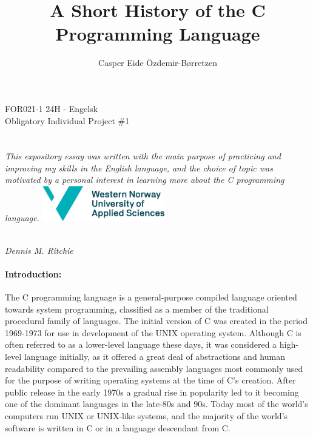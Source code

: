 \documentclass{report}%
\title{A Short History of the C Programming Language}
\author{Casper Eide Özdemir-Børretzen}
\begin{document}
\makeatletter
\begin{titlepage}
\begin{center}
\vspace*{6cm}
\large{FOR021-1 24H  - Engelsk\\Obligatory Individual Project \#1}\\
\vspace{0.5cm}
\LARGE{\@title}\\
\vspace{1cm}
\large{\@author}\\
\vspace{2cm}
\small{\textit{This expository essay was written with the main purpose of practicing and improving my skills in the English language, and the choice of topic was motivated by a personal interest in learning more about the C programming language.}}
\vfill
\includegraphics[width=0.4\textwidth]{hvl_logo_engelsk.png}\\
\end{center}
\end{titlepage}
\makeatother

\newpage

\begin{center}
\vspace{0.25cm}
\\\textit{Dennis M. Ritchie}
\end{center}

\vspace{0.75cm}

\paragraph{Introduction:}
The C programming language is a general-purpose compiled language oriented towards system programming, classified as a member of the traditional procedural family of languages. The initial version of C was created in the period 1969-1973 for use in development of the UNIX operating system. Although C is often referred to as a lower-level language these days, it was considered a high-level language initially, as it offered a great deal of abstractions and human readability compared to the prevailing assembly languages most commonly used for the purpose of writing operating systems at the time of C’s creation. After public release in the early 1970s a gradual rise in popularity led to it becoming one of the dominant languages in the late-80s and 90s. Today most of the world’s computers run UNIX or UNIX-like systems, and the majority of the world’s software is written in C or in a language descendant from C.
\end{document}
